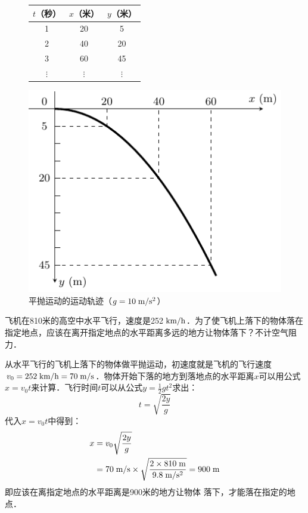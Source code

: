 \begin{figure}[htbp]
    \centering
    \begin{minipage}{0.35\linewidth}
    	\centering
    	\begin{tabular}{ccc}
    		\hline
    		$t$（秒）   &  $x$（米）   &  $y$（米）\\
    		\hline
    		1 & 20 & 5\\
    		2 & 40 & 20\\
    		3 & 60 & 45\\
    		$\vdots$ & $\vdots$ & $\vdots$\\
    		\hline
    	\end{tabular}
    \end{minipage}
    \hfil
    \begin{minipage}{0.5\linewidth}
    	\centering
    	\includegraphics{fig/A/4-11.pdf}
    \end{minipage}
    \caption{平抛运动的运动轨迹（$g=10 \;\text{m}/\text{s}^2 $）}\label{fig_A_4-11}
\end{figure}

\begin{example}
飞机在810米的高空中水平飞行，速度是252$\;\text{km}/\text{h}$．为了使飞机上落下的物体落在指定地点，应该在离开指定地点的水平距离多远的地方让物体落下？不计空气阻力．
\end{example}

\begin{solution}
从水平飞行的飞机上落下的物体做平抛运动，初速度就是飞机的飞行速度$v_0=252\;\text{km}/\text{h}=70\;\text{m}/\text{s}$．物体开始下落的地方到落地点的水平距离$x$可以用公式$x=v_0t$来计算．飞行时间$t$可以从公式$y=\frac{1}{2}gt^2$求出：
\[t=\sqrt{\frac{2y}{g}} \]
代入$x=v_0 t$中得到：
\[\begin{split}
x&=v_0\sqrt{\frac{2y}{g}}\\
&=70\;\text{m}/\text{s} \times \sqrt{\frac{2\times 810 \;\text{m}}{9.8\;\text{m}/\text{s}^2}}=900\;\text{m}
\end{split} \]
即应该在离指定地点的水平距离是900米的地方让物体
落下，才能落在指定的地点．
\end{solution}


